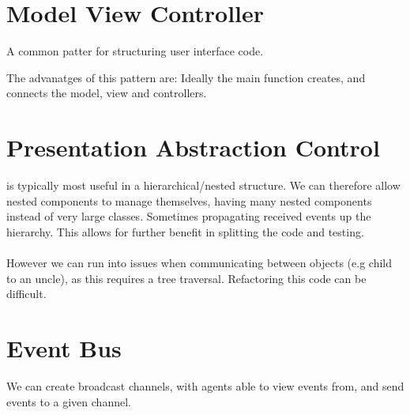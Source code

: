 \documentclass{report}
\begin{document}
    \section*{Model View Controller}
        A common patter for structuring user interface code.
        \begin{itemize}
        \end{itemize}
        The advanatges of this pattern are:
        Ideally the main function creates, and connects the model, view and controllers.
    \section*{Presentation Abstraction Control}
         is typically most useful in a hierarchical/nested structure.
        We can therefore allow nested components to manage themselves, having many nested components instead of very large classes. Sometimes propagating received events up the hierarchy.
        This allows for further benefit in splitting the code and testing.
        \\
        \\ However we can run into issues when communicating between objects (e.g child to an uncle), as this requires a tree traversal. Refactoring this code can be difficult.
    \section*{Event Bus}
        We can create broadcast channels, with agents able to view events from, and send events to a given channel.
\end{document}
